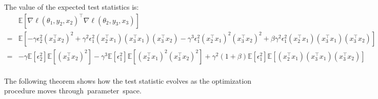 \documentclass[conference]{IEEEtran}
\newcommand{\Ex}[1]{\mathbb{E}[ #1 ]}
\begin{document}
The value of the expected test statistics is:
\begin{align*}
&\Ex{ \nabla \ell ( \theta_1, y_2, x_2 )^\top \nabla \ell ( \theta_2, y_3, x_3 ) }\\
=& \Ex{ - \gamma \epsilon_2^2 ( x_3^\top x_2 )^2 + \gamma^2 \epsilon_1^2 ( x_2^\top x_1 ) ( x_3^\top x_1 ) ( x_3^\top x_2 ) 
- \gamma^3 \epsilon_1^2 ( x_2^\top x_1 )^2 ( x_3^\top x_2 )^2 + \beta \gamma^2 \epsilon_1^2 ( x_2^\top x_1 ) ( x_3^\top x_1 ) ( x_3^\top x_2 ) } \\
=& - \gamma \Ex{ \epsilon_2^2 } \Ex{ ( x_3^\top x_2 )^2 } - \gamma^3 \Ex { \epsilon_1^2 } \Ex { ( x_2^\top x_1 )^2 ( x_3^\top x_2 )^2 }  + \gamma^2 ( 1 + \beta ) \Ex{ \epsilon_1^2 } \Ex{ ( x_2^\top x_1 ) ( x_3^\top x_1 ) ( x_3^\top x_2 ) } \\
\end{align*}


The following theorem shows how the test statistic evolves as the optimization procedure moves through~parameter~space.
\end{document}
